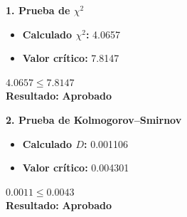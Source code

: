 \noindent
\begin{minipage}[t]{0.48\textwidth}
    \textbf{1. Prueba de \(\chi^2\)}
    \vspace{0.3cm}
    \begin{itemize}[itemsep=0.4em]
        \item \textbf{Calculado \(\chi^2\):} 4.0657
        \item \textbf{Valor crítico:} 7.8147
    \end{itemize}

    \begin{center}
        \vspace{0.5cm}
        \(4.0657 \leq 7.8147\)
        \vspace{0.1cm}
        \\\textbf{Resultado: }
        \textcolor{green!60!black}{\textbf{Aprobado}}
    \end{center}

    \vspace{0.8cm}

    \textbf{2. Prueba de Kolmogorov--Smirnov}
    \vspace{0.3cm}
    \begin{itemize}[itemsep=0.4em]
        \item \textbf{Calculado \(D\):} 0.001106
        \item \textbf{Valor crítico:} 0.004301
    \end{itemize}
    \begin{center}
        \vspace{0.5cm}
        \(0.0011 \leq 0.0043\)
        \vspace{0.1cm}
        \\\textbf{Resultado: }
        \textcolor{green!60!black}{\textbf{Aprobado}}
    \end{center}

\end{minipage}
\hfill
